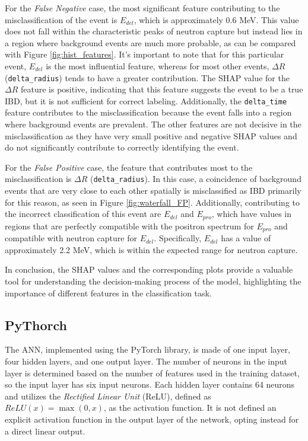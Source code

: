 For the \textit{False Negative} case, the most significant feature contributing to the misclassification of the event is $E_{del}$, which is approximately 0.6 MeV. This value does not fall within the characteristic peaks of neutron capture but instead lies in a region where background events are much more probable, as can be compared with Figure \ref{fig:hist_features}. It's important to note that for this particular event, $E_{del}$ is the most influential feature, whereas for most other events, $\Delta R$ (\texttt{delta\_radius}) tends to have a greater contribution. The SHAP value for the $\Delta R$ feature is positive, indicating that this feature suggests the event to be a true IBD, but it is not sufficient for correct labeling. Additionally, the \texttt{delta\_time} feature contributes to the misclassification because the event falls into a region where background events are prevalent. The other features are not decisive in the misclassification as they have very small positive and negative SHAP values and do not significantly contribute to correctly identifying the event.

For the \textit{False Positive} case, the feature that contributes most to the misclassification is $\Delta R$ (\texttt{delta\_radius}). In this case, a coincidence of background events that are very close to each other spatially is misclassified as IBD primarily for this reason, as seen in Figure \ref{fig:waterfall_FP}. Additionally, contributing to the incorrect classification of this event are $E_{del}$ and $E_{pro}$, which have values in regions that are perfectly compatible with the positron spectrum for $E_{pro}$ and compatible with neutron capture for $E_{del}$. Specifically, $E_{del}$ has a value of approximately 2.2 MeV, which is within the expected range for neutron capture.


In conclusion, the SHAP values and the corresponding plots provide a valuable tool for understanding the decision-making process of the model, highlighting the importance of different features in the classification task. 


\subsection{PyThorch}
The ANN, implemented using the PyTorch library, is made of one input layer, four hidden layers, and one output layer. The number of neurons in the input layer is determined based on the number of features used in the training dataset, so the input layer has six input neurons. Each hidden layer contains 64 neurons and utilizes the \textit{Rectified Linear Unit} (ReLU), defined as $ ReLU(x) = \max(0, x) $, as the activation function. It is not defined an explicit activation function in the output layer of the network, opting instead for a direct linear output.

